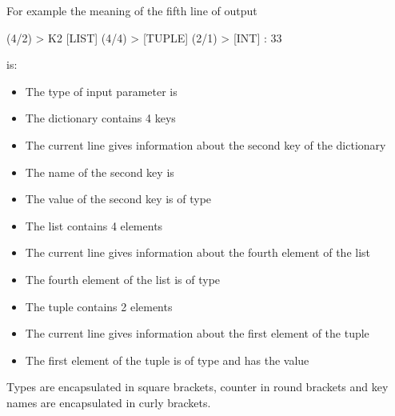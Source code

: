 For example the meaning of the fifth line of output

\begin{robotlog}
[DICT] (4/2) > {K2} [LIST] (4/4) > [TUPLE] (2/1) > [INT]  :  33
\end{robotlog}

is:

\begin{itemize}
   \item The type of input parameter  is 
   \item The dictionary contains 4 keys
   \item The current line gives information about the second key of the dictionary
   \item The name of the second key is 
   \item The value of the second key is of type 
   \item The list contains 4 elements
   \item The current line gives information about the fourth element of the list
   \item The fourth element of the list is of type 
   \item The tuple contains 2 elements
   \item The current line gives information about the first element of the tuple
   \item The first element of the tuple is of type  and has the value 
\end{itemize}

Types are encapsulated in square brackets, counter in round brackets and key names are encapsulated in curly brackets.

